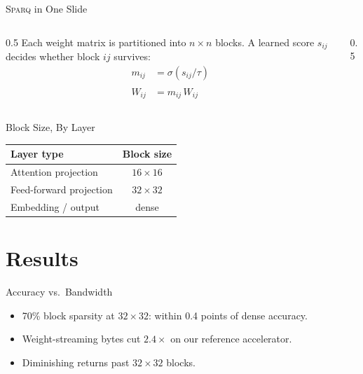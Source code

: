 \documentclass[11pt]{beamer}
\newcommand{\model}{\textsc{Sparq}\xspace}
\begin{document}
\begin{frame}{\model{} in One Slide}
  \begin{columns}
    \begin{column}{0.5\textwidth}
      Each weight matrix is partitioned into $n\times n$ blocks. A
      learned score $s_{ij}$ decides whether block $ij$ survives:
      \begin{align}
        m_{ij} &= \sigma(s_{ij}/\tau) \\
        \widehat{W}_{ij} &= m_{ij}\, W_{ij}
      \end{align}
    \end{column}
    \begin{column}{0.5\textwidth}
    \end{column}
  \end{columns}
\end{frame}

\begin{frame}[fragile]{Block Size, By Layer}
  \begin{table}
    \centering
    \begin{tabular}{lc}
      \toprule
      Layer type & Block size \\
      \midrule
      Attention projection & $16\times 16$ \\
      Feed-forward projection & $32\times 32$ \\
      Embedding / output & dense \\
      \bottomrule
    \end{tabular}
  \end{table}
\end{frame}

\section{Results}

\begin{frame}{Accuracy vs.\ Bandwidth}
  \begin{itemize}
    \item 70\% block sparsity at $32\times 32$: within 0.4 points of
      dense accuracy.
    \item Weight-streaming bytes cut $2.4\times$ on our reference
      accelerator.
    \item[$\to$] Diminishing returns past $32\times 32$ blocks.
  \end{itemize}
\end{frame}
\end{document}
